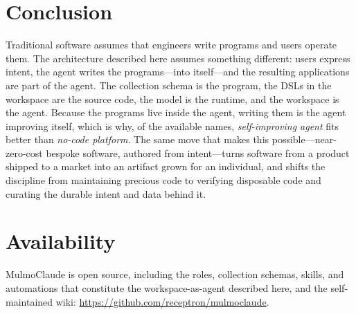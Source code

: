 \documentclass[11pt]{article}
\begin{document}
\section{Conclusion}
\label{sec:conclusion}

Traditional software assumes that engineers write programs and users operate them.
The architecture described here assumes something different: users express intent,
the agent writes the programs---into itself---and the resulting applications are part
of the agent. The collection schema is the program, the DSLs in the workspace are
the source code, the model is the runtime, and the workspace is the agent. Because
the programs live inside the agent, writing them is the agent improving itself, which
is why, of the available names, \emph{self-improving agent} fits better than
\emph{no-code platform}. The same move that makes this possible---near-zero-cost
bespoke software, authored from intent---turns software from a product shipped to a
market into an artifact grown for an individual, and shifts the discipline from
maintaining precious code to verifying disposable code and curating the durable
intent and data behind it.

\section*{Availability}
MulmoClaude is open source, including the roles, collection schemas, skills, and
automations that constitute the workspace-as-agent described here, and the
self-maintained wiki: \url{https://github.com/receptron/mulmoclaude}.



\end{document}
